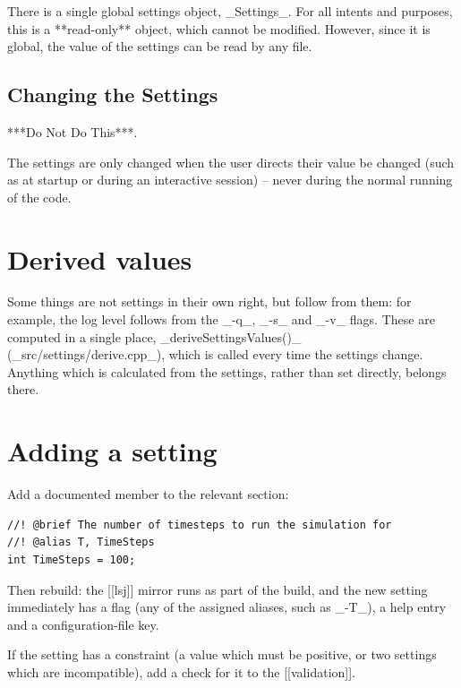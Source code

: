 	There is a single global settings object, _Settings_. For all intents and purposes, this is a **read-only** object, which cannot be modified. However, since it is global, the value of the settings can be read by any file.

	\subsection{Changing the Settings}

		***Do Not Do This***.

		The settings are only changed when the user directs their value be changed (such as at startup or during an interactive session) -- never during the normal running of the code.

\section{Derived values}

	Some things are not settings in their own right, but follow from them: for example, the log level follows from the _-q_, _-s_ and _-v_ flags. These are computed in a single place, _deriveSettingsValues()_ (_src/settings/derive.cpp_), which is called every time the settings change. Anything which is calculated from the settings, rather than set directly, belongs there.

\section{Adding a setting}

	Add a documented member to the relevant section:

	\begin{lstlisting}
//! @brief The number of timesteps to run the simulation for
//! @alias T, TimeSteps
int TimeSteps = 100;
\end{lstlisting}

	Then rebuild: the [[lsj]] mirror runs as part of the build, and the new setting immediately has a flag (any of the assigned aliases, such as _-T_), a help entry and a configuration-file key.

	If the setting has a constraint (a value which must be positive, or two settings which are incompatible), add a check for it to the [[validation]].
